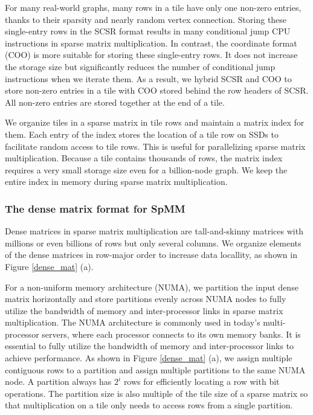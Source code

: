 For many real-world graphs, many rows in a tile have only one non-zero entries,
thanks to their sparsity and nearly random vertex connection. Storing these
single-entry rows in the SCSR format results in many conditional jump CPU
instructions in sparse matrix multiplication.
In contrast, the coordinate format (COO) is more suitable for storing these
single-entry rows. It does not increase the storage size but significantly
reduces the number of conditional jump instructions when we iterate
them. As a result, we hybrid SCSR and COO to store non-zero entries in a tile
with COO stored behind the row headers of SCSR. All non-zero entries are
stored together at the end of a tile.

We organize tiles in a sparse matrix in tile rows and maintain a matrix index
for them. Each entry of the index stores the location of a tile row on SSDs
to facilitate random access
to tile rows. This is useful for parallelizing sparse matrix multiplication.
Because a tile contains thousands of rows, the matrix index requires a very
small storage size even for a billion-node graph. We keep the entire index
in memory during sparse matrix multiplication.

\subsubsection{The dense matrix format for SpMM} \label{numa_mat}
Dense matrices in sparse matrix multiplication are tall-and-skinny matrices
with millions or even billions of rows but only several columns. We organize
elements of the dense matrices in row-major order to increase data locallity,
as shown in Figure \ref{dense_mat} (a).

For a non-uniform memory architecture (NUMA), we partition the input dense matrix
horizontally and store partitions evenly across NUMA nodes to fully utilize
the bandwidth of memory and inter-processor links in sparse matrix
multiplication. The NUMA architecture is commonly used in today's multi-processor
servers, where each processor connects to its own memory banks. It is essential
to fully utilize the bandwidth of memory and inter-processor links to achieve
performance. As shown in Figure \ref{dense_mat} (a), we assign multiple
contiguous rows to a partition and assign multiple partitions to the same
NUMA node. A partition always has $2^i$ rows for efficiently locating a row
with bit operations. The partition size is also multiple of the tile size of
a sparse matrix so that multiplication on a tile only needs to access rows
from a single partition.

